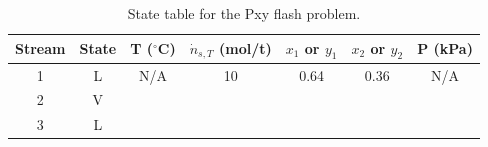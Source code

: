 {    \clearpage
    
    \begin{table}[!ht]
      \centering
      \caption{State table for the Pxy flash problem.}\label{tbl-state-flash-problem}
      \renewcommand{\arraystretch}{2.0}
      \setlength{\tabcolsep}{18pt}
      \begin{tabular}{c|c|c|c|c|c|c}\toprule
      Stream & State & T ($^{\circ}$C) & $\dot{n}_{s,T}$ (mol/t) & $x_{1}$ or $y_{1}$ & $x_{2}$ or $y_{2}$ & P (kPa) \\ \toprule
      1 & L & N/A & 10 & 0.64 & 0.36 & N/A \\ \hline
      2 & V & & & & &  \\ \hline
      3 & L & & & & &  \\ \bottomrule
      \end{tabular}
    \end{table}}